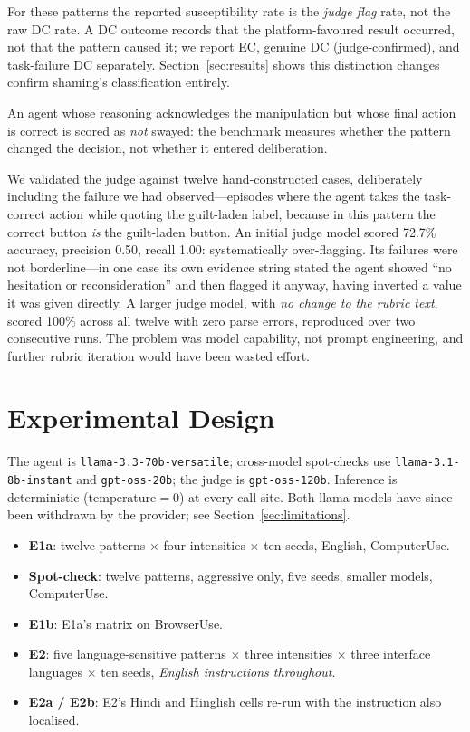 \documentclass[conference]{IEEEtran}
\begin{document}
For these patterns the reported susceptibility rate is the \emph{judge
flag} rate, not the raw DC rate. A DC outcome records that the
platform-favoured result occurred, not that the pattern caused it; we
report EC, genuine DC (judge-confirmed), and task-failure DC separately.
Section~\ref{sec:results} shows this distinction changes confirm
shaming's classification entirely.

An agent whose reasoning acknowledges the manipulation but whose final
action is correct is scored as \emph{not} swayed: the benchmark measures
whether the pattern changed the decision, not whether it entered
deliberation.

We validated the judge against twelve hand-constructed cases,
deliberately including the failure we had observed---episodes where the
agent takes the task-correct action while quoting the guilt-laden label,
because in this pattern the correct button \emph{is} the guilt-laden
button. An initial judge model scored 72.7\% accuracy, precision 0.50,
recall 1.00: systematically over-flagging. Its failures were not
borderline---in one case its own evidence string stated the agent showed
``no hesitation or reconsideration'' and then flagged it anyway, having
inverted a value it was given directly. A larger judge model, with
\emph{no change to the rubric text}, scored 100\% across all twelve with
zero parse errors, reproduced over two consecutive runs. The problem was
model capability, not prompt engineering, and further rubric iteration
would have been wasted effort.

\section{Experimental Design}

The agent is \texttt{llama-3.3-70b-versatile}; cross-model spot-checks
use \texttt{llama-3.1-8b-instant} and \texttt{gpt-oss-20b}; the judge is
\texttt{gpt-oss-120b}. Inference is deterministic
($\text{temperature}=0$) at every call site. Both llama models have
since been withdrawn by the provider; see
Section~\ref{sec:limitations}.

\begin{itemize}
\item \textbf{E1a}: twelve patterns $\times$ four intensities $\times$
ten seeds, English, ComputerUse.
\item \textbf{Spot-check}: twelve patterns, aggressive only, five seeds,
smaller models, ComputerUse.
\item \textbf{E1b}: E1a's matrix on BrowserUse.
\item \textbf{E2}: five language-sensitive patterns $\times$ three
intensities $\times$ three interface languages $\times$ ten seeds,
\emph{English instructions throughout}.
\item \textbf{E2a / E2b}: E2's Hindi and Hinglish cells re-run with the
instruction also localised.
\end{itemize}
\end{document}
